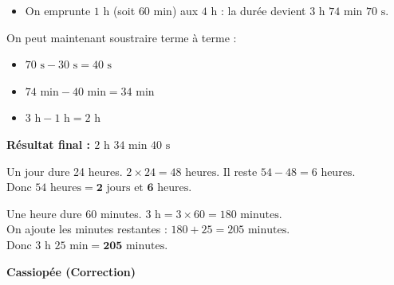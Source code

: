 \documentclass[a4paper]{book}
\begin{document}
{\begin{exercice}
\begin{minipage}{0.49\linewidth}
\begin{tcolorbox}[colback=white, colframe=gray, title=Correction - Soustraction]
\begin{itemize}
                    \item On emprunte $1\text{ h}$ (soit $60\text{ min}$) aux $4\text{ h}$ : la durée devient $3\text{ h } 74\text{ min } 70\text{ s}$.
                \end{itemize}
                On peut maintenant soustraire terme à terme :
                \begin{itemize}
                    \item $70\text{ s} - 30\text{ s} = 40\text{ s}$
                    \item $74\text{ min} - 40\text{ min} = 34\text{ min}$
                    \item $3\text{ h} - 1\text{ h} = 2\text{ h}$
                \end{itemize}
                \textbf{Résultat final : $2\text{ h } 34\text{ min } 40\text{ s}$}
            \end{tcolorbox}
        \end{minipage}    

        \medskip
        \begin{minipage}{0.5\linewidth}
            \begin{tcolorbox}[colback=white, colframe=gray, title=Correction B1]
                Un jour dure 24 heures. 
                $2 \times 24 = 48\text{ heures}$. Il reste $54 - 48 = 6\text{ heures}$.\\
                Donc $54\text{ heures} = \textbf{2}\text{ jours et }\textbf{6}\text{ heures}$.
            \end{tcolorbox}
        \end{minipage}
        \hfill
        \begin{minipage}{0.49\linewidth}
            \begin{tcolorbox}[colback=white, colframe=gray, title=Correction B2]
                Une heure dure 60 minutes. 
                $3\text{ h} = 3 \times 60 = 180\text{ minutes}$.\\
                On ajoute les minutes restantes : $180 + 25 = 205\text{ minutes}$.\\
                Donc $3\text{ h } 25\text{ min} = \textbf{205}\text{ minutes}$.
            \end{tcolorbox}
        \end{minipage} 
    \end{exercice}

    \begin{exercice}
        \textbf{Cassiopée (Correction)}
        

\end{exercice}}
\end{document}
